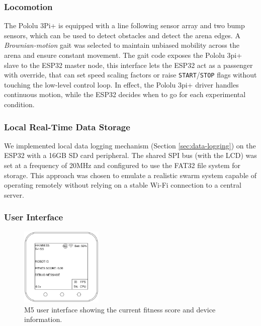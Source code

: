 \documentclass[conference]{IEEEtran}
\begin{document}
\subsubsection{Locomotion}\label{sec:locomotion}

The Pololu 3Pi+ is equipped with a line following sensor array and two bump sensors, which can be used to detect obstacles and detect the arena edges. A \emph{Brownian-motion} gait was selected to maintain unbiased mobility across the arena and ensure constant movement. The gait code exposes the Pololu 3pi+ slave to the ESP32 master node, this interface lets the ESP32 act as a passenger with override, that can set speed scaling factors or raise \texttt{START}/\texttt{STOP} flags without touching the low-level control loop. In effect, the Pololu 3pi+ driver handles continuous motion, while the ESP32 decides when to go for each experimental condition. \\

\subsubsection{Local Real-Time Data Storage}
We implemented local data logging mechanism (Section \ref{sec:data-logging}) on the ESP32 with a 16GB SD card peripheral. The shared SPI bus (with the LCD) was set at a frequency of 20MHz and configured to use the FAT32 file system for storage. This approach was chosen to emulate a realistic swarm system capable of operating remotely without relying on a stable Wi-Fi connection to a central server.\\

\subsubsection{User Interface}

\begin{figure}[h]
    \centering
    \includegraphics[width=0.35\textwidth]{UI.png}
    \caption{M5 user interface showing the current fitness score and device information.}
    \label{fig:UI}
\end{figure}
\end{document}

